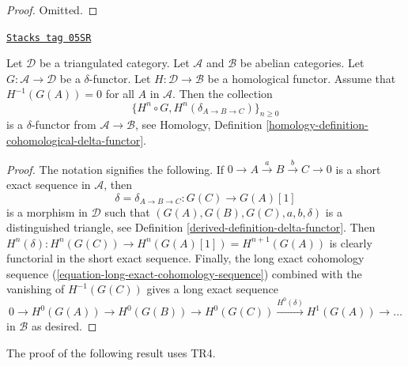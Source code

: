 \begin{proof}
Omitted.
\end{proof}

\begin{lemma}
\label{derived-lemma-compose-delta-functor-homological}
\href{https://stacks.math.columbia.edu/tag/05SR}{\texttt{Stacks tag 05SR}}

Let $\mathcal{D}$ be a triangulated category.
Let $\mathcal{A}$ and $\mathcal{B}$ be abelian categories.
Let $G : \mathcal{A} \to \mathcal{D}$ be a $\delta$-functor.
Let $H : \mathcal{D} \to \mathcal{B}$ be a homological functor.
Assume that $H^{-1}(G(A)) = 0$ for all $A$ in $\mathcal{A}$.
Then the collection
$$
\{H^n \circ G, H^n(\delta_{A \to B \to C})\}_{n \geq 0}
$$
is a $\delta$-functor from $\mathcal{A} \to \mathcal{B}$, see
Homology, Definition \ref{homology-definition-cohomological-delta-functor}.
\end{lemma}

\begin{proof}

The notation signifies the following. If
$0 \to A \xrightarrow{a} B \xrightarrow{b} C \to 0$ is
a short exact sequence in $\mathcal{A}$, then
$$
\delta = \delta_{A \to B \to C} : G(C) \to G(A)[1]
$$
is a morphism in $\mathcal{D}$ such that
$(G(A), G(B), G(C), a, b, \delta)$ is
a distinguished triangle, see
Definition \ref{derived-definition-delta-functor}.
Then $H^n(\delta) : H^n(G(C)) \to H^n(G(A)[1]) = H^{n + 1}(G(A))$
is clearly functorial in the short exact sequence.
Finally, the long exact cohomology sequence
(\ref{equation-long-exact-cohomology-sequence})
combined with the vanishing of $H^{-1}(G(C))$
gives a long exact sequence
$$
0 \to H^0(G(A)) \to H^0(G(B)) \to H^0(G(C))
\xrightarrow{H^0(\delta)} H^1(G(A)) \to \ldots
$$
in $\mathcal{B}$ as desired.
\end{proof}

The proof of the following result uses TR4.

